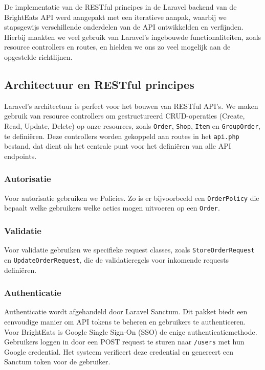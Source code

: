 De implementatie van de RESTful principes in de Laravel backend van de Bright\-Eats API werd aangepakt met een iteratieve aanpak, waarbij we stapsgewijs verschillende onderdelen van de API ontwikkelden en verfijnden. Hierbij maakten we veel gebruik van Laravel's ingebouwde functionaliteiten, zoals resource controllers en routes, en hielden we ons zo veel mogelijk aan de opgestelde richtlijnen.

\subsection{Architectuur en RESTful principes}

Laravel's architectuur is perfect voor het bouwen van RESTful API's. We maken gebruik van resource controllers om gestructureerd CRUD-operaties (Create, Read, Update, Delete) op onze resources, zoals \texttt{Order}, \texttt{Shop}, \texttt{Item} en \texttt{GroupOrder}, te definiëren. Deze controllers worden gekoppeld aan routes in het \texttt{api.php} bestand, dat dient als het centrale punt voor het definiëren van alle API endpoints.

\subsubsection{Autorisatie}

Voor autorisatie gebruiken we Policies. Zo is er bijvoorbeeld een \texttt{OrderPolicy} die bepaalt welke gebruikers welke acties mogen uitvoeren op een \texttt{Order}.

\subsubsection{Validatie}

Voor validatie gebruiken we specifieke request classes, zoals \texttt{StoreOrderRequest} en \texttt{UpdateOrderRequest}, die de validatieregels voor inkomende requests definiëren.

\subsubsection{Authenticatie}

Authenticatie wordt afgehandeld door Laravel Sanctum. Dit pakket biedt een eenvoudige manier om API tokens te beheren en gebruikers te authenticeren. Voor Bright\-Eats is Google Single Sign-On (SSO) de enige authenticatiemethode. Gebruikers loggen in door een POST request te sturen naar \texttt{/users} met hun Google credential. Het systeem verifieert deze credential en genereert een Sanctum token voor de gebruiker.

